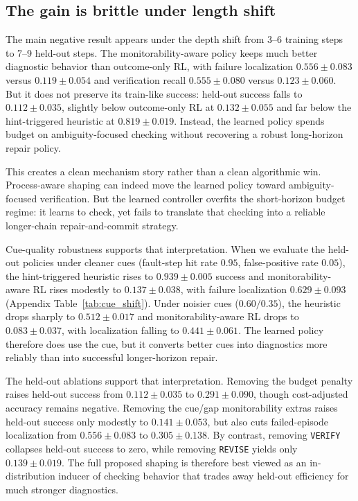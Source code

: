 \documentclass{article}
\begin{document}
\subsection{The gain is brittle under length shift}
The main negative result appears under the depth shift from 3--6 training steps to 7--9 held-out steps. The monitorability-aware policy keeps much better diagnostic behavior than outcome-only RL, with failure localization $0.556 \pm 0.083$ versus $0.119 \pm 0.054$ and verification recall $0.555 \pm 0.080$ versus $0.123 \pm 0.060$. But it does not preserve its train-like success: held-out success falls to $0.112 \pm 0.035$, slightly below outcome-only RL at $0.132 \pm 0.055$ and far below the hint-triggered heuristic at $0.819 \pm 0.019$. Instead, the learned policy spends budget on ambiguity-focused checking without recovering a robust long-horizon repair policy.

This creates a clean mechanism story rather than a clean algorithmic win. Process-aware shaping can indeed move the learned policy toward ambiguity-focused verification. But the learned controller overfits the short-horizon budget regime: it learns to check, yet fails to translate that checking into a reliable longer-chain repair-and-commit strategy.

Cue-quality robustness supports that interpretation. When we evaluate the held-out policies under cleaner cues (fault-step hit rate $0.95$, false-positive rate $0.05$), the hint-triggered heuristic rises to $0.939 \pm 0.005$ success and monitorability-aware RL rises modestly to $0.137 \pm 0.038$, with failure localization $0.629 \pm 0.093$ (Appendix Table~\ref{tab:cue_shift}). Under noisier cues ($0.60/0.35$), the heuristic drops sharply to $0.512 \pm 0.017$ and monitorability-aware RL drops to $0.083 \pm 0.037$, with localization falling to $0.441 \pm 0.061$. The learned policy therefore does use the cue, but it converts better cues into diagnostics more reliably than into successful longer-horizon repair.

The held-out ablations support that interpretation. Removing the budget penalty raises held-out success from $0.112 \pm 0.035$ to $0.291 \pm 0.090$, though cost-adjusted accuracy remains negative. Removing the cue/gap monitorability extras raises held-out success only modestly to $0.141 \pm 0.053$, but also cuts failed-episode localization from $0.556 \pm 0.083$ to $0.305 \pm 0.138$. By contrast, removing \texttt{VERIFY} collapses held-out success to zero, while removing \texttt{REVISE} yields only $0.139 \pm 0.019$. The full proposed shaping is therefore best viewed as an in-distribution inducer of checking behavior that trades away held-out efficiency for much stronger diagnostics.
\end{document}
